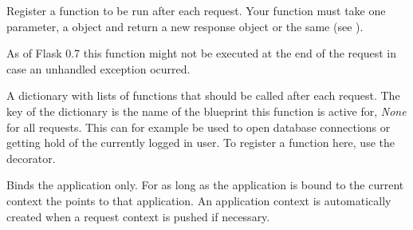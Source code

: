 \documentclass[a4paper,12pt]{sphinxmanual}
\begin{document}
\begin{fulllineitems}
\begin{fulllineitems}
\begin{quote}
\begin{description}
\begin{itemize}
\end{itemize}

\end{description}\end{quote}

\end{fulllineitems}


\begin{fulllineitems}
\label{api:flask.Flask.after_request}
Register a function to be run after each request.  Your function
must take one parameter, a {\hyperref[api:flask.Flask.response_class]{}} object and return
a new response object or the same (see {\hyperref[api:flask.Flask.process_response]{}}).

As of Flask 0.7 this function might not be executed at the end of the
request in case an unhandled exception ocurred.

\end{fulllineitems}


\begin{fulllineitems}
\label{api:flask.Flask.after_request_funcs}
A dictionary with lists of functions that should be called after
each request.  The key of the dictionary is the name of the blueprint
this function is active for, \emph{None} for all requests.  This can for
example be used to open database connections or getting hold of the
currently logged in user.  To register a function here, use the
{\hyperref[api:flask.Flask.after_request]{}} decorator.

\end{fulllineitems}


\begin{fulllineitems}
\label{api:flask.Flask.app_context}
Binds the application only.  For as long as the application is bound
to the current context the {\hyperref[api:flask.current_app]{}} points to that
application.  An application context is automatically created when a
request context is pushed if necessary.


\end{fulllineitems}
\end{fulllineitems}
\end{document}
